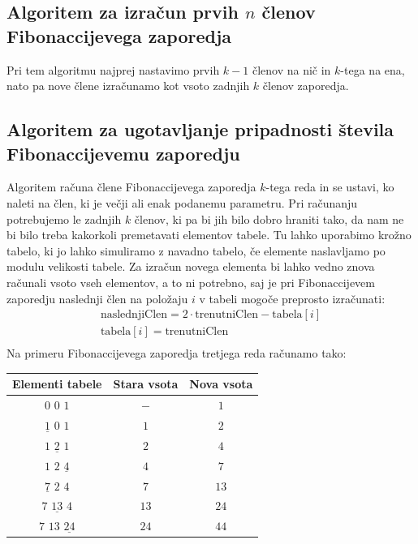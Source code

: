 \documentclass[10pt,a4paper,oneside]{book}
\begin{document}
\subsection{Algoritem za izračun prvih $n$ členov Fibonaccijevega zaporedja}
Pri tem algoritmu najprej nastavimo prvih $k-1$ členov na nič in $k$-tega na ena, nato pa nove člene izračunamo kot vsoto zadnjih $k$ členov zaporedja.


\subsection{Algoritem za ugotavljanje pripadnosti števila Fibonaccijevemu zaporedju}
Algoritem računa člene Fibonaccijevega zaporedja $k$-tega reda in se ustavi, ko naleti na člen, ki je večji ali enak podanemu parametru. Pri računanju potrebujemo le zadnjih $k$ členov, ki pa bi jih bilo dobro hraniti tako, da nam ne bi bilo treba kakorkoli premetavati elementov tabele. Tu lahko uporabimo krožno tabelo, ki jo lahko simuliramo z navadno tabelo, če elemente naslavljamo po modulu velikosti tabele. Za izračun novega elementa bi lahko vedno znova računali vsoto vseh elementov, a to ni potrebno, saj je pri Fibonaccijevem zaporedju naslednji člen na položaju $i$ v tabeli mogoče preprosto izračunati:\\
\[\begin{array}{l}
\mbox{naslednjiClen} = 2\cdot\mbox{trenutniClen} - \mbox{tabela}[i]\\
\mbox{tabela}[i] = \mbox{trenutniClen}\\
\end{array}\]
Na primeru Fibonaccijevega zaporedja tretjega reda računamo tako:
\begin{center}
\begin{tabular}{c|c|c}
	Elementi tabele & Stara vsota & Nova vsota \\
	\hline
	$0$ $0$ $1$ & $-$ & $1$\\
	$\underline{1}$ $0$ $1$ & $1$ & $2$\\
	$1$ $\underline{2}$ $1$ & $2$ & $4$\\
	$1$ $2$ $\underline{4}$ & $4$ & $7$\\
	$\underline{7}$ $2$ $4$ & $7$ & $13$\\
	$7$ $\underline{13}$ $4$ & $13$ & $24$\\
	$7$ $13$ $\underline{24}$ & $24$ & $44$\\
\end{tabular}
\end{center}
\end{document}
